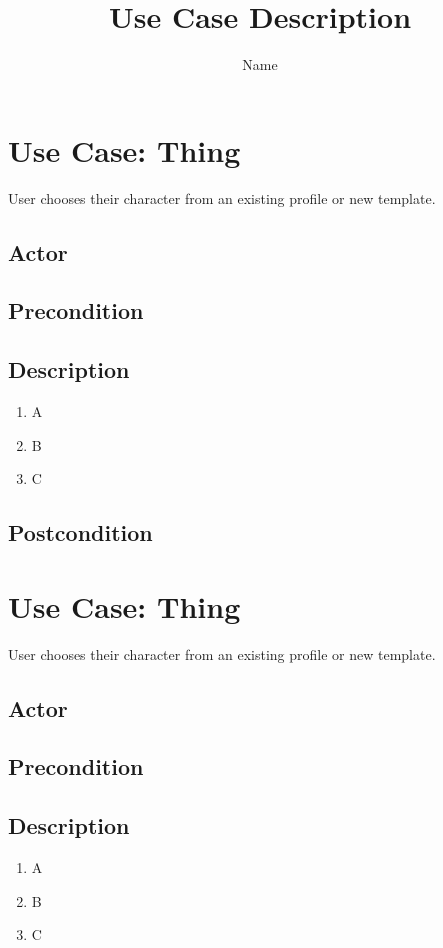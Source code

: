 \documentclass[11pt]{article}
\title{Use Case Description}
\author{Name}
\begin{document}
    \maketitle


    \section{Use Case: Thing}
	User chooses their character from an existing profile or new template.

		\subsection{Actor}

		\subsection{Precondition}
 
		\subsection{Description}
			\begin{enumerate}
			\item A
			\item B
			\item C
			\end{enumerate}

		\subsection{Postcondition}

    \section{Use Case: Thing}
	User chooses their character from an existing profile or new template.

		\subsection{Actor}

		\subsection{Precondition}
 
		\subsection{Description}
			\begin{enumerate}
			\item A
			\item B
			\item C
			\end{enumerate}
\end{document}
